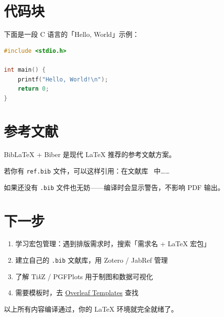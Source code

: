 \documentclass[a4paper,12pt]{ctexart}  %
\begin{document}
\section{代码块}
\label{sec:code}

下面是一段 C 语言的「Hello, World」示例：

\begin{lstlisting}[language=C, caption={Hello World in C}]
#include <stdio.h>

int main() {
    printf("Hello, World!\n");
    return 0;
}
\end{lstlisting}

\section{参考文献}
\label{sec:ref}

BibLaTeX + Biber 是现代 LaTeX 推荐的参考文献方案。

若你有 \texttt{ref.bib} 文件，可以这样引用：在文献库~\cite{example} 中……

如果还没有 \texttt{.bib} 文件也无妨——编译时会显示警告，不影响 PDF 输出。

\printbibliography

\section{下一步}
\label{sec:next}

\begin{enumerate}
    \item 学习宏包管理：遇到排版需求时，搜索「需求名 + LaTeX 宏包」
    \item 建立自己的 \texttt{.bib} 文献库，用 Zotero / JabRef 管理
    \item 了解 Ti\textit{k}Z / PGFPlots 用于制图和数据可视化
    \item 需要模板时，去 \href{https://www.overleaf.com/latex/templates}{Overleaf Templates} 查找
\end{enumerate}

以上所有内容编译通过，你的 LaTeX 环境就完全就绪了。
\end{document}
